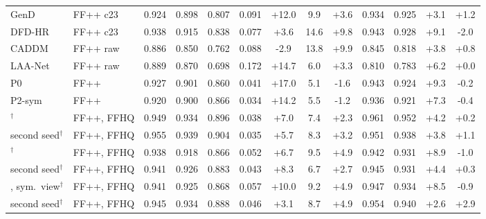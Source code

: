 \begin{tabular}{@{}ll ccccccc cccc@{}}
GenD~\cite{gend2026} & FF++ c23 & 0.924 & 0.898 & 0.807 & 0.091 & +12.0 & 9.9 & +3.6 & 0.934 & 0.925 & +3.1 & +1.2 \\
DFD-HR~\cite{dfdhr2026} & FF++ c23 & 0.938 & 0.915 & 0.838 & 0.077 & +3.6 & 14.6 & +9.8 & 0.943 & 0.928 & +9.1 & -2.0 \\
CADDM~\cite{caddm} & FF++ raw & 0.886 & 0.850 & 0.762 & 0.088 & -2.9 & 13.8 & +9.9 & 0.845 & 0.818 & +3.8 & +0.8 \\
LAA-Net~\cite{laanet} & FF++ raw & 0.889 & 0.870 & 0.698 & 0.172 & +14.7 & 6.0 & +3.3 & 0.810 & 0.783 & +6.2 & +0.0 \\
\midrule
P0 & FF++ & 0.927 & 0.901 & 0.860 & 0.041 & +17.0 & 5.1 & -1.6 & 0.943 & 0.924 & +9.3 & -0.2 \\
P2-sym & FF++ & 0.920 & 0.900 & 0.866 & 0.034 & +14.2 & 5.5 & -1.2 & 0.936 & 0.921 & +7.3 & -0.4 \\
\oursB{}$^\dagger$ & FF++, FFHQ & 0.949 & 0.934 & 0.896 & 0.038 & +7.0 & 7.4 & +2.3 & 0.961 & 0.952 & +4.2 & +0.2 \\
\quad second seed$^\dagger$ & FF++, FFHQ & 0.955 & 0.939 & 0.904 & 0.035 & +5.7 & 8.3 & +3.2 & 0.951 & 0.938 & +3.8 & +1.1 \\
\oursF{}$^\dagger$ & FF++, FFHQ & 0.938 & 0.918 & 0.866 & 0.052 & +6.7 & 9.5 & +4.9 & 0.942 & 0.931 & +8.9 & -1.0 \\
\quad second seed$^\dagger$ & FF++, FFHQ & 0.941 & 0.926 & 0.883 & 0.043 & +8.3 & 6.7 & +2.7 & 0.945 & 0.931 & +4.4 & +0.3 \\
\oursF{}, sym.\ view$^\dagger$ & FF++, FFHQ & 0.941 & 0.925 & 0.868 & 0.057 & +10.0 & 9.2 & +4.9 & 0.947 & 0.934 & +8.5 & -0.9 \\
\quad second seed$^\dagger$ & FF++, FFHQ & 0.945 & 0.934 & 0.888 & 0.046 & +3.1 & 8.7 & +4.9 & 0.954 & 0.940 & +2.6 & +2.9 \\
\bottomrule
\end{tabular}
